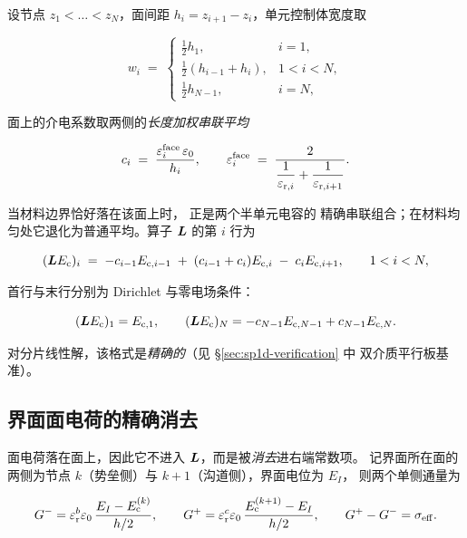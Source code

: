 设节点 $z_1<\dots<z_N$，面间距 $h_i=z_{i+1}-z_i$，单元控制体宽度取

\begin{equation}
w_i \;=\;
\begin{cases}
\tfrac12 h_1, & i=1,\\[2pt]
\tfrac12 (h_{i-1}+h_i), & 1<i<N,\\[2pt]
\tfrac12 h_{N-1}, & i=N,
\end{cases}
\label{eq:cv-width}
\end{equation}

面上的介电系数取两侧的\emph{长度加权串联平均}

\begin{equation}
c_i \;=\; \frac{\varepsilon^{\mathrm{face}}_i\,\varepsilon_{0}}{h_i},
\qquad
\varepsilon^{\mathrm{face}}_i \;=\; \frac{2}{\dfrac{1}{\varepsilon_{\mathrm{r},i}}+\dfrac{1}{\varepsilon_{\mathrm{r},i+1}}}.
\label{eq:face-coeff}
\end{equation}

当材料边界恰好落在该面上时， 正是两个半单元电容的
精确串联组合；在材料均匀处它退化为普通平均。算子 $\bm{L}$ 的第 $i$ 行为

\begin{equation}
(\bm{L}E_{\mathrm{c}})_i \;=\;
-c_{i-1}E_{\mathrm{c},i-1} \;+\; (c_{i-1}+c_i)E_{\mathrm{c},i} \;-\; c_iE_{\mathrm{c},i+1},
\qquad 1<i<N,
\label{eq:L-row}
\end{equation}

首行与末行分别为 Dirichlet 与零电场条件：

\begin{equation}
(\bm{L}E_{\mathrm{c}})_1 = E_{\mathrm{c},1},
\qquad
(\bm{L}E_{\mathrm{c}})_N = -c_{N-1}E_{\mathrm{c},N-1} + c_{N-1}E_{\mathrm{c},N} .
\label{eq:L-bc}
\end{equation}

对分片线性解，该格式是\emph{精确的}（见 \S\ref{sec:sp1d-verification} 中
双介质平行板基准）。

\subsection{界面面电荷的精确消去}
\label{sec:sp1d-sheet}

面电荷落在面上，因此它不进入 $\bm{L}$，而是被\emph{消去}进右端常数项。
记界面所在面的两侧为节点 $k$（势垒侧）与 $k+1$（沟道侧），界面电位为 $E_I$，
则两个单侧通量为

\begin{equation}
G^{-} = \varepsilon_{\mathrm{r}}^{b}\varepsilon_{0}\,\frac{E_I-E_{\mathrm{c}}^{(k)}}{h/2},
\qquad
G^{+} = \varepsilon_{\mathrm{r}}^{c}\varepsilon_{0}\,\frac{E_{\mathrm{c}}^{(k+1)}-E_I}{h/2},
\qquad
G^{+}-G^{-} = \sigma_{\mathrm{eff}} .
\label{eq:sheet-flux}
\end{equation}

